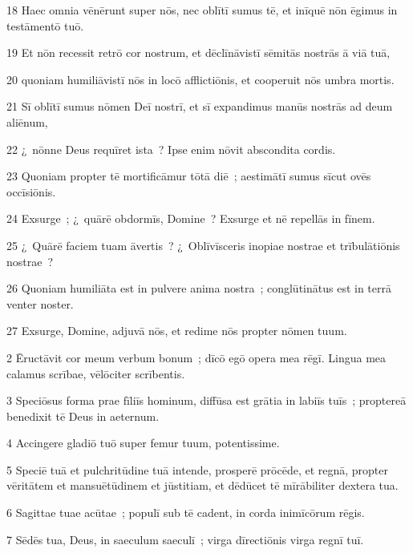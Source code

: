 \psalmVerse
  {\phantom{0}18}
  {Haec omnia vēnērunt super nōs, nec oblītī sumus tē, et inīquē nōn ēgimus in testāmentō tuō.}


\psalmVerse
  {\phantom{0}19}
  {Et nōn recessit retrō cor nostrum, et dēclīnāvistī sēmitās nostrās ā viā tuā,}


\psalmVerse
  {\phantom{0}20}
  {quoniam humiliāvistī nōs in locō afflictiōnis, et cooperuit nōs umbra mortis.}


\psalmVerse
  {\phantom{0}21}
  {Sī oblītī sumus nōmen Deī nostrī, et sī expandimus manūs nostrās ad deum aliēnum,}


\psalmVerse
  {\phantom{0}22}
  {¿~nōnne Deus requīret ista~? Ipse enim nōvit abscondita cordis.}


\psalmVerse
  {\phantom{0}23}
  {Quoniam propter tē mortificāmur tōtā diē~; aestimātī sumus sīcut ovēs occīsiōnis.}


\psalmVerse
  {\phantom{0}24}
  {Exsurge~; ¿~quārē obdormīs, Domine~? Exsurge et nē repellās in fīnem.}


\psalmVerse
  {\phantom{0}25}
  {¿~Quārē faciem tuam āvertis~? ¿~Oblīvīsceris inopiae nostrae et trībulātiōnis nostrae~?}


\psalmVerse
  {\phantom{0}26}
  {Quoniam humiliāta est in pulvere anima nostra~; conglūtinātus est in terrā venter noster.}


\psalmVerse
  {\phantom{0}27}
  {Exsurge, Domine, adjuvā nōs, et redime nōs propter nōmen tuum.}



\psalmVerse
  {\phantom{00}2}
  {Ēructāvit cor meum verbum bonum~; dīcō egō opera mea rēgī. Lingua mea calamus scrībae, vēlōciter scrībentis.}


\psalmVerse
  {\phantom{00}3}
  {Speciōsus forma prae fīliīs hominum, diffūsa est grātia in labiīs tuīs~; proptereā benedixit tē Deus in aeternum.}


\psalmVerse
  {\phantom{00}4}
  {Accingere gladiō tuō super femur tuum, potentissime.}


\psalmVerse
  {\phantom{00}5}
  {Speciē tuā et pulchritūdine tuā intende, prosperē prōcēde, et regnā, propter vēritātem et mansuētūdinem et jūstitiam, et dēdūcet tē mīrābiliter dextera tua.}


\psalmVerse
  {\phantom{00}6}
  {Sagittae tuae acūtae~; populī sub tē cadent, in corda inimīcōrum rēgis.}


\psalmVerse
  {\phantom{00}7}
  {Sēdēs tua, Deus, in saeculum saeculī~; virga dīrectiōnis virga regnī tuī.}


